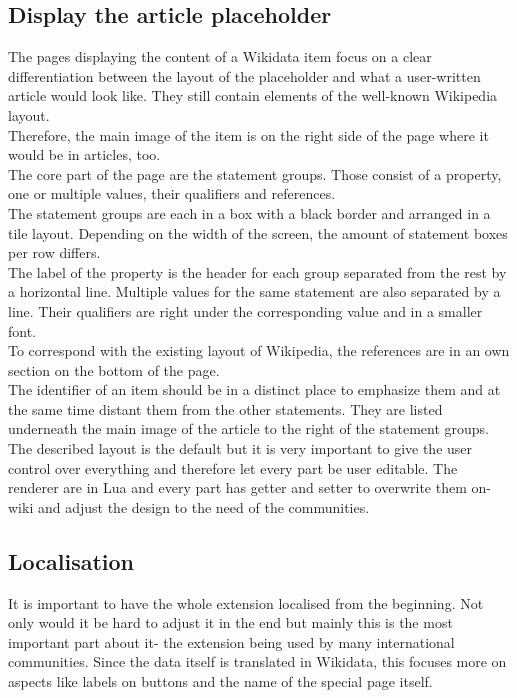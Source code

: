 \documentclass[11pt]{article}
\begin{document}
\subsection{Display the article placeholder}
The pages displaying the content of a Wikidata item focus on a clear differentiation between the layout of the placeholder and what a user-written article would look like. They still contain elements of the well-known Wikipedia layout. \\
Therefore, the main image of the item is on the right side of the page where it would be in articles, too.\\
The core part of the page are the statement groups. Those consist of a property, one or multiple values, their qualifiers and references. \\
The statement groups are each in a box with a black border and arranged in a tile layout. Depending on the width of the screen, the amount of statement boxes per row differs. \\
The label of the property is the header for each group separated from the rest by a horizontal line. Multiple values for the same statement are also separated by a line. Their qualifiers are right under the corresponding value and in a smaller font. \\
To correspond with the existing layout of Wikipedia, the references are in an own section on the bottom of the page. \\
The identifier of an item should be in a distinct place to emphasize them and at the same time distant them from the other statements. They are listed underneath the main image of the article to the right of the statement groups. \\
The described layout is the default but it is very important to give the user control over everything and therefore let every part be user editable. The renderer are in Lua and every part has getter and setter to overwrite them on-wiki and adjust the design to the need of the communities. \\

\subsection{Localisation}
It is important to have the whole extension localised from the beginning. Not only would it be hard to adjust it in the end but mainly this is the most important part about it- the extension being used by many international communities. Since the data itself is translated in Wikidata, this focuses more on aspects like labels on buttons and the name of the special page itself. \\
\end{document}
